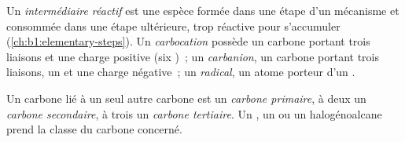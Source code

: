 \begin{definition}\label{def:b1:electronic-effects:intermediates}
Un \emph{intermédiaire réactif} est une espèce formée dans
une étape d'un mécanisme et consommée dans une étape ultérieure, trop
réactive pour s'accumuler (\cref{ch:b1:elementary-steps}). Un
\emph{carbocation} possède un carbone portant trois
liaisons et une charge positive (six )~; un
\emph{carbanion}, un carbone portant trois liaisons, un
 et une charge négative~; un \emph{radical},
un atome porteur d'un .
\end{definition}

\begin{definition}\label{def:b1:electronic-effects:carbon-class}
Un carbone lié à un seul autre carbone est un \emph{carbone
primaire}, à deux un \emph{carbone
secondaire}, à trois un \emph{carbone
tertiaire}. Un , un  ou un
halogénoalcane prend la classe du carbone concerné.
\end{definition}

